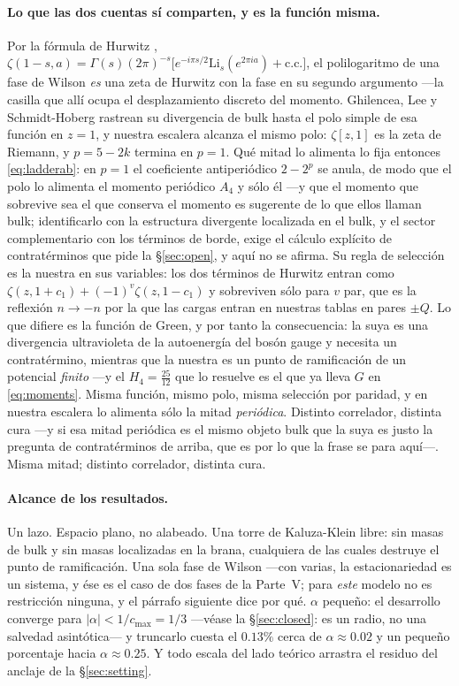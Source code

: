 \documentclass[11pt,a4paper]{article}
\begin{document}
\paragraph{Lo que las dos cuentas sí comparten, y es la función misma.} Por la fórmula de Hurwitz \cite{Hurwitz1882,Apostol},
$\zeta(1-s,a)=\Gamma(s)(2\pi)^{-s}\bigl[e^{-i\pi s/2}\mathrm{Li}_s(e^{2\pi i a})+\text{c.c.}\bigr]$,
el polilogaritmo de una fase de Wilson \emph{es} una zeta de Hurwitz con la fase en su segundo
argumento ---la casilla que allí ocupa el desplazamiento discreto del momento. Ghilencea, Lee y
Schmidt-Hoberg
\cite{GLS06} rastrean su divergencia de bulk hasta el polo simple de esa función en $z=1$, y nuestra
escalera alcanza el mismo polo: $\zeta[z,1]$ es la zeta de Riemann, y $p=5-2k$ termina en $p=1$. Qué
mitad lo alimenta lo fija entonces \eqref{eq:ladderab}: en $p=1$ el coeficiente antiperiódico
$2-2^{p}$ se anula, de modo que el polo lo alimenta el momento periódico $A_4$ y sólo él ---y
que el momento que sobrevive sea el que conserva el momento es sugerente de lo que ellos llaman
bulk; identificarlo con la estructura divergente localizada en el bulk, y el sector complementario
con los términos de borde, exige el cálculo explícito de contratérminos que pide la
\S\ref{sec:open}, y aquí no se afirma. Su regla de selección
es la nuestra en sus variables: los dos términos de Hurwitz entran como
$\zeta(z,1+c_1)+(-1)^{v}\zeta(z,1-c_1)$ y sobreviven sólo para $v$ par, que es la reflexión
$n\to-n$ por la que las cargas entran en nuestras tablas en pares $\pm Q$. Lo que difiere es la
función de Green, y por tanto la consecuencia: la suya es una divergencia ultravioleta de la
autoenergía del bosón gauge y necesita un contratérmino, mientras que la nuestra es un punto de
ramificación de un potencial \emph{finito} ---y el $H_4=\tfrac{25}{12}$ que lo resuelve es el que ya
lleva $G$ en \eqref{eq:moments}. Misma función, mismo polo, misma selección por paridad, y en
nuestra escalera lo alimenta sólo la mitad \emph{periódica}. Distinto correlador, distinta cura
---y si esa mitad periódica es el mismo objeto bulk que la suya es justo la pregunta de
contratérminos de arriba, que es por lo que la frase se para aquí---. Misma
mitad; distinto correlador, distinta cura.

\paragraph{Alcance de los resultados.} Un lazo. Espacio plano, no alabeado. Una torre de
Kaluza-Klein libre: sin masas de bulk y sin masas localizadas en la brana, cualquiera de las cuales
destruye el punto de ramificación. Una sola fase de Wilson ---con varias, la estacionariedad es un
sistema, y ése es el caso de dos fases de la Parte~V; para \emph{este} modelo no es restricción
ninguna, y el párrafo siguiente dice por qué. $\alpha$ pequeño: el desarrollo converge para
$|\alpha|<1/c_{\max}=1/3$ ---véase la \S\ref{sec:closed}: es un radio, no una salvedad
asintótica--- y truncarlo cuesta el $0.13\%$ cerca de $\alpha\approx0.02$ y un pequeño porcentaje
hacia $\alpha\approx0.25$. Y todo
escala del lado teórico arrastra el residuo del anclaje de la \S\ref{sec:setting}.
\end{document}
